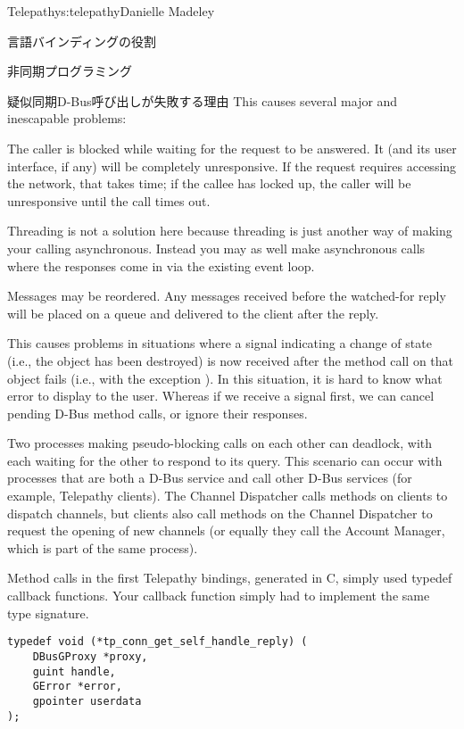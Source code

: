 \begin{aosachapter}{Telepathy}{s:telepathy}{Danielle Madeley}
\begin{aosasect1}{言語バインディングの役割}
\begin{aosasect2}{非同期プログラミング}
\begin{aosabox}{疑似同期D-Bus呼び出しが失敗する理由}
This causes several major and inescapable problems:

\begin{aosaitemize}

  \item The caller is blocked while waiting for the request to be
    answered.  It (and its user interface, if any) will be completely
    unresponsive. If the request requires accessing the network, that
    takes time; if the callee has locked up, the caller will be
    unresponsive until the call times out.

    Threading is not a solution here because threading is just another
    way of making your calling asynchronous. Instead you may as well
    make asynchronous calls where the responses come in via the
    existing event loop.

  \item Messages may be reordered. Any messages received before the
    watched-for reply will be placed on a queue and delivered to the
    client after the reply.

    This causes problems in situations where a signal indicating a
    change of state (i.e., the object has been destroyed) is now
    received after the method call on that object fails (i.e., with
    the exception ).  In this situation, it is
    hard to know what error to display to the user.  Whereas if we
    receive a signal first, we can cancel pending D-Bus method calls,
    or ignore their responses.

  \item Two processes making pseudo-blocking calls on each other can
    deadlock, with each waiting for the other to respond to its query.
    This scenario can occur with processes that are both a D-Bus
    service and call other D-Bus services (for example, Telepathy
    clients). The Channel Dispatcher calls methods on clients to
    dispatch channels, but clients also call methods on the Channel
    Dispatcher to request the opening of new channels (or equally they
    call the Account Manager, which is part of the same process).

\end{aosaitemize}
\end{aosabox}

Method calls in the first Telepathy bindings, generated in C, simply
used typedef callback functions. Your callback function simply had to
implement the same type signature.

\begin{verbatim}
typedef void (*tp_conn_get_self_handle_reply) (
    DBusGProxy *proxy,
    guint handle,
    GError *error,
    gpointer userdata
);
\end{verbatim}


\end{aosasect2}
\end{aosasect1}
\end{aosachapter}
